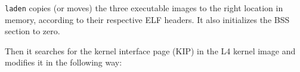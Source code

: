 \begin{comment}
  Later, the L4 kernel will support the optional UTCB paging server
  $\sigma_1$, which has to be treated like the other initial servers
  by \texttt{laden}.  A command line option to \texttt{laden} will
  allow the user to specify if the third module is the rootserver or
  $\sigma_1$.  If $\sigma_1$ is used, the rootserver is the fourth
  module in the list.
\end{comment}

\texttt{laden} copies (or moves) the three executable images to the
right location in memory, according to their respective ELF headers.
It also initializes the BSS section to zero.

\begin{comment}
  Laden has to deal with overlapping source and destination memory
  areas in an intelligent way.  It currently will detect such
  situations, but is not always able to find a solution, even if one
  exists.
  
  If a memory area stretches out to the very last page addressible in
  32 bit, the high address of the memory descriptor will overflow.
  This is in fact the behaviour of \texttt{kickstart}.  \texttt{laden}
  currently truncates such an area by one page.  This needs
  clarification in the L4 standard.
\end{comment}

Then it searches for the kernel interface page (KIP) in the L4 kernel
image and modifies it in the following way:

